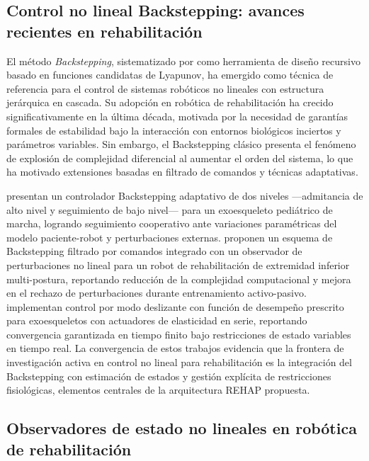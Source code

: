 \documentclass[a4paper,12pt]{article}
\begin{document}
\subsection{Control no lineal Backstepping: avances recientes en rehabilitación}

El método \textit{Backstepping}, sistematizado por \citet{krstic1995nonlinear} como herramienta de diseño recursivo basado en funciones candidatas de Lyapunov, ha emergido como técnica de referencia para el control de sistemas robóticos no lineales con estructura jerárquica en cascada. Su adopción en robótica de rehabilitación ha crecido significativamente en la última década, motivada por la necesidad de garantías formales de estabilidad bajo la interacción con entornos biológicos inciertos y parámetros variables. Sin embargo, el Backstepping clásico presenta el fenómeno de explosión de complejidad diferencial al aumentar el orden del sistema, lo que ha motivado extensiones basadas en filtrado de comandos y técnicas adaptativas.

\citet{narayan2024adaptive} presentan un controlador Backstepping adaptativo de dos niveles ---admitancia de alto nivel y seguimiento de bajo nivel--- para un exoesqueleto pediátrico de marcha, logrando seguimiento cooperativo ante variaciones paramétricas del modelo paciente-robot y perturbaciones externas. \citet{ren2025command} proponen un esquema de Backstepping filtrado por comandos integrado con un observador de perturbaciones no lineal para un robot de rehabilitación de extremidad inferior multi-postura, reportando reducción de la complejidad computacional y mejora en el rechazo de perturbaciones durante entrenamiento activo-pasivo. \citet{zhang2025sliding} implementan control por modo deslizante con función de desempeño prescrito para exoesqueletos con actuadores de elasticidad en serie, reportando convergencia garantizada en tiempo finito bajo restricciones de estado variables en tiempo real. La convergencia de estos trabajos evidencia que la frontera de investigación activa en control no lineal para rehabilitación es la integración del Backstepping con estimación de estados y gestión explícita de restricciones fisiológicas, elementos centrales de la arquitectura REHAP propuesta.

\subsection{Observadores de estado no lineales en robótica de rehabilitación}
\end{document}
